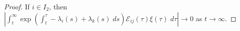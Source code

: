 \documentclass[a4paper,11pt]{article}
\newtheorem{proposition}{Proposition}[section]
\theoremstyle{remark}
\begin{document}
\begin{proof}
If $i\in I_2$, then $\left|\int_t^\infty \exp\left(\int_t^\tau -\lambda_i(s)+\lambda_k(s) \; ds\right)\mathcal{E}_{ij}(\tau)\xi(\tau) \; d\tau\right| \rightarrow 0$ as $t \rightarrow \infty$.
\end{proof}

%
%
%
\end{document}
